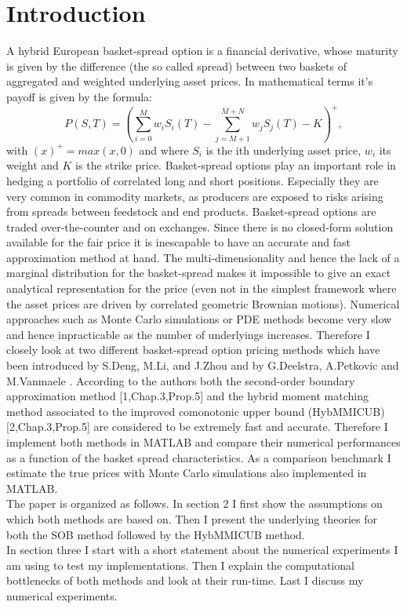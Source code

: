 \documentclass[a4paper]{article}
\begin{document}
\section{Introduction}
A hybrid European basket-spread option is a financial derivative, whose
maturity is given by the difference (the so called spread) between two 
baskets of aggregated and weighted underlying asset prices. In mathematical terms it's payoff is given by 
the formula:
\begin{equation}
\label{eq:po}
P(S,T) = (\sum_{i=0}^M w_iS_i(T) - \sum_{j=M+1}^{M+N} w_jS_j(T) - K)^+,
\end{equation}
with $(x)^+=max(x,0)$ and where $S_i$ is the ith underlying asset price, $w_i$ its weight and $K$ is the strike price.
Basket-spread options play an important role in hedging a portfolio of correlated long and short
positions. Especially they are very common in commodity markets,
as producers are exposed to risks arising from spreads between feedstock and end products.
Basket-spread options are traded over-the-counter and on exchanges. Since there is no
closed-form solution available for the fair price it is inescapable to have an accurate and
fast approximation method at hand. The multi-dimensionality and
hence the lack of a marginal distribution for the basket-spread makes it impossible to give an exact
analytical representation for the price (even not in the simplest framework
where the asset prices are driven by  correlated geometric Brownian motions). Numerical approaches such 
as Monte Carlo simulations or PDE methods become very slow and hence inpracticable as the number of underlyings increases. 
Therefore I closely look at two different basket-spread option pricing methods which have been 
introduced by S.Deng, M.Li, and J.Zhou \cite{sob} and by G.Deelstra, A.Petkovic and M.Vanmaele \cite{hybmmicub}. According to the authors both the second-order
boundary approximation method [1,Chap.3,Prop.5] and the hybrid moment matching method associated to the improved comonotonic upper bound (HybMMICUB)
[2,Chap.3,Prop.5] are considered to be extremely fast and accurate. Therefore I implement both methods in MATLAB
and compare their numerical performances as a function of the basket spread characteristics. 
As a comparison benchmark I estimate the true prices with Monte Carlo simulations also implemented in MATLAB.\\
The paper is organized as follows. In section 2 I first show the assumptions on which both methods are based on. Then I present the underlying theories for both the  SOB method followed by the HybMMICUB method.\\
In section three I start with a short statement about the numerical experiments I am using to test my implementations. Then I explain the computational bottlenecks of both methods and look at their run-time. Last I discuss my numerical experiments.
\end{document}
